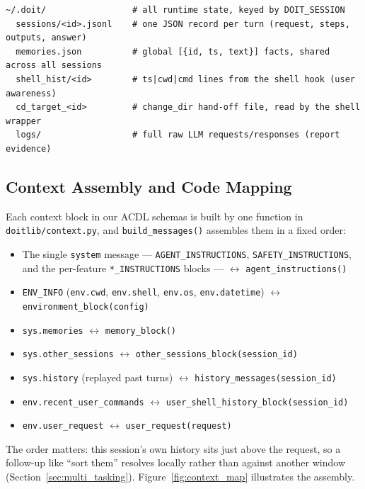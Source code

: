 \documentclass[11pt,a4paper]{article}
\begin{document}
\begin{lstlisting}[numbers=none, basicstyle=\ttfamily\scriptsize, breaklines=true, caption={Runtime state under \texttt{\textasciitilde/.doit/}.}]
~/.doit/                 # all runtime state, keyed by DOIT_SESSION
  sessions/<id>.jsonl    # one JSON record per turn (request, steps, outputs, answer)
  memories.json          # global [{id, ts, text}] facts, shared across all sessions
  shell_hist/<id>        # ts|cwd|cmd lines from the shell hook (user awareness)
  cd_target_<id>         # change_dir hand-off file, read by the shell wrapper
  logs/                  # full raw LLM requests/responses (report evidence)
\end{lstlisting}

\subsection{Context Assembly and Code Mapping}
\label{sec:context_mapping}
Each context block in our ACDL schemas is built by one function in \texttt{doitlib/context.py}, and \texttt{build\_messages()} assembles them in a fixed order:
\begin{itemize}
    \item The single \texttt{system} message --- \texttt{AGENT\_INSTRUCTIONS}, \texttt{SAFETY\_INSTRUCTIONS}, and the per-feature \texttt{*\_INSTRUCTIONS} blocks --- $\longleftrightarrow$ \texttt{agent\_instructions()}
    \item \texttt{ENV\_INFO} (\texttt{env.cwd}, \texttt{env.shell}, \texttt{env.os}, \texttt{env.datetime}) $\longleftrightarrow$ \texttt{environment\_block(config)}
    \item \texttt{sys.memories} $\longleftrightarrow$ \texttt{memory\_block()}
    \item \texttt{sys.other\_sessions} $\longleftrightarrow$ \texttt{other\_sessions\_block(session\_id)}
    \item \texttt{sys.history} (replayed past turns) $\longleftrightarrow$ \texttt{history\_messages(session\_id)}
    \item \texttt{env.recent\_user\_commands} $\longleftrightarrow$ \texttt{user\_shell\_history\_block(session\_id)}
    \item \texttt{env.user\_request} $\longleftrightarrow$ \texttt{user\_request(request)}
\end{itemize}
The order matters: this session's own history sits just above the request, so a follow-up like ``sort them'' resolves locally rather than against another window (Section~\ref{sec:multi_tasking}). Figure~\ref{fig:context_map} illustrates the assembly.
\end{document}
